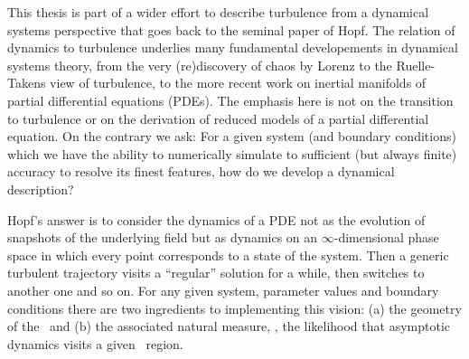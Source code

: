 


%






This thesis is part of a wider effort  to describe turbulence from
a dynamical systems perspective that goes back to the seminal paper of
Hopf. The relation of dynamics to turbulence underlies many 
fundamental developements in dynamical systems theory, 
from the very (re)discovery of chaos by Lorenz to the
Ruelle-Takens view of turbulence, to the more recent work on inertial
manifolds of partial differential equations (PDEs).
The emphasis here is not on the transition to turbulence or on the derivation
of reduced models of a partial differential equation. On the contrary we ask:
For a given system (and boundary conditions) which we have the ability
to numerically simulate to sufficient (but always finite) accuracy to resolve
its finest features, how do we develop a dynamical description?

Hopf's answer is to consider the dynamics of a PDE not as the evolution
of snapshots of the underlying field but as dynamics on an $\infty$-dimensional
phase space in which every point corresponds to a state of the system. Then
a generic turbulent trajectory visits a ``regular'' solution for a while, then
switches to another one and so on.
For any given system, parameter values and boundary conditions there are two
ingredients to implementing this vision: (a) the geometry of the \statesp\ and 
(b) the associated natural measure, \ie, the likelihood that asymptotic dynamics 
visits a given \statesp\ region.

